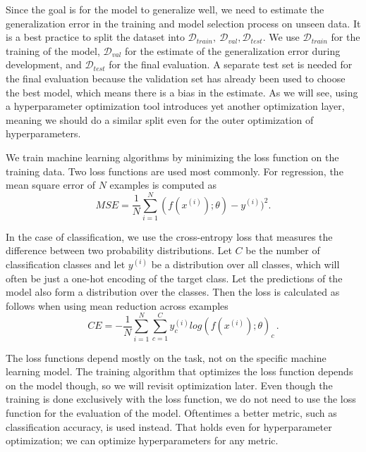 Since the goal is for the model to generalize well, we need to estimate the generalization error in the training and model selection process on unseen data. It is a best practice to split the dataset into $\mathcal{D}_{train}, \  \mathcal{D}_{val}, \mathcal{D}_{test}$. We use $\mathcal{D}_{train}$ for the training of the model, $\mathcal{D}_{val}$ for the estimate of the generalization error during development, and $\mathcal{D}_{test}$ for the final evaluation. A separate test set is needed for the final evaluation because the validation set has already been used to choose the best model, which means there is a bias in the estimate. As we will see, using a hyperparameter optimization tool introduces yet another optimization layer, meaning we should do a similar split even for the outer optimization of hyperparameters.


We train machine learning algorithms by minimizing the loss function on the training data. Two loss functions are used most commonly. For regression, the mean square error of $N$ examples is computed as $$ MSE=\frac{1}{N} \sum_{i=1}^{N} (f(x^{(i)});\theta )-y^{(i)})^2.$$

In the case of classification, we use the cross-entropy loss that measures the difference between two probability distributions. Let $C$ be the number of classification classes and let $y^{(i)}$ be a distribution over all classes, which will often be just a one-hot encoding of the target class. Let the predictions of the model also form a distribution over the classes. Then the loss is calculated as follows when using mean reduction across examples $$CE=-\frac{1}{N} \sum_{i=1}^{N} \sum_{c=1}^{C} y^{(i)}_c log(f(x^{(i)});\theta )_c\, .$$

The loss functions depend mostly on the task, not on the specific machine learning model. The training algorithm that optimizes the loss function depends on the model though, so we will revisit optimization later. Even though the training is done exclusively with the loss function, we do not need to use the loss function for the evaluation of the model. Oftentimes a better metric, such as classification accuracy, is used instead. That holds even for hyperparameter optimization; we can optimize hyperparameters for any metric.


